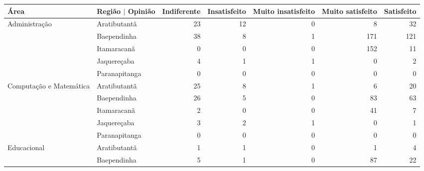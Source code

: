 \begin{table}[ht]
\centering
\begin{tabular}{ll rrrrr}
  \toprule
 Área                    & Região $\vert$ Opinião & \multicolumn{1}{l}{ Indiferente} & \multicolumn{1}{l}{ Insatisfeito} & \multicolumn{1}{l}{ Muito insatisfeito} & \multicolumn{1}{l}{ Muito satisfeito} & \multicolumn{1}{l}{ Satisfeito} \\ 
   \midrule
Administração           & Aratibutantã            &          23 &           12 &                  0 &                8 &         32 \\ 
                          & Baependinha             &          38 &            8 &                  1 &              171 &        121 \\ 
                          & Itamaracanã             &           0 &            0 &                  0 &              152 &         11 \\ 
                          & Jaquereçaba             &           4 &            1 &                  1 &                0 &          2 \\ 
                          & Paranapitanga           &           0 &            0 &                  0 &                0 &          0 \\ 
  Computação e Matemática & Aratibutantã            &          25 &            8 &                  1 &                6 &         20 \\ 
                          & Baependinha             &          26 &            5 &                  0 &               83 &         63 \\ 
                          & Itamaracanã             &           2 &            0 &                  0 &               41 &          7 \\ 
                          & Jaquereçaba             &           3 &            2 &                  1 &                0 &          1 \\ 
                          & Paranapitanga           &           0 &            0 &                  0 &                0 &          0 \\ 
  Educacional             & Aratibutantã            &           1 &            1 &                  0 &                1 &          4 \\ 
                          & Baependinha             &           5 &            1 &                  0 &               87 &         22 \\ 

\end{tabular}
\end{table}
